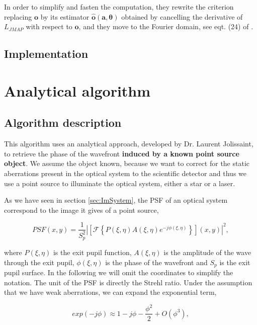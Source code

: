 In order to simplify and fasten the computation, they rewrite the criterion replacing $\mathbf{o}$ by its estimator $\hat{\mathbf{o}}(\mathbf{a},\boldsymbol{\theta})$ obtained by cancelling the derivative of $L_{JMAP}$ with respect to $\mathbf{o}$, and they move to the Fourier domain, see eqt. (24) of \citet[p.21]{mugnier_2006}.

\subsection{Implementation}
\label{subsec:OneraAlgoImp}



\section{Analytical algorithm}
\label{sec:AnAlgo}

\subsection{Algorithm description}
\label{subsec:ANalgoDesc}

This algorithm uses an analytical approach, developed by Dr. Laurent Jolissaint, to retrieve the phase of the wavefront \textbf{induced by a known point source object}. We assume the object known, because we want to correct for the static aberrations present in the optical system to the scientific detector and thus we use a point source to illuminate the optical system, either a star or a laser.

As we have seen in section \ref{sec:ImSystem}, the PSF of an optical system correspond to the image it gives of a point source,

\begin{equation}
PSF(x,y) = \frac{1}{S_p^2}|\left[\mathcal{F}\left\lbrace P(\xi,\eta)A(\xi,\eta)e^{-j\phi(\xi,\eta)} \right\rbrace\right](x,y)|^2,
\label{eqt:PSF}
\end{equation}

where $P(\xi,\eta)$ is the exit pupil function, $A(\xi,\eta)$ is the amplitude of the wave through the exit pupil, $\phi(\xi,\eta)$ is the phase of the wavefront and $S_p$ is the exit pupil surface. In the following we will omit the coordinates to simplify the notation. The unit of the PSF is directly the Strehl ratio. Under the assumption that we have weak aberrations, we can expand the exponential term,

\begin{equation}
exp(-j\phi)\approx 1 - j\phi - \frac{\phi^2}{2} + O(\phi^3),
\label{eqt:expansionPhase}
\end{equation}

